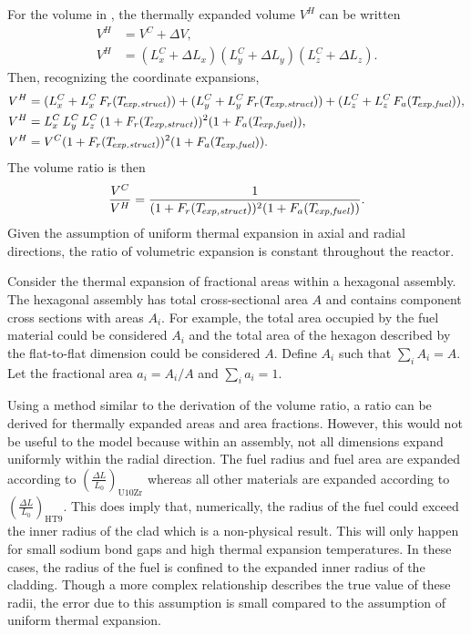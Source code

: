     For the volume in , the thermally expanded 
    volume $V^H$ can be written
    \begin{align}
      V^H &= V^C + \Delta V, \\
      V^H &= (L_x^C + \Delta L_x) (L_y^C + \Delta L_y) (L_z^C + \Delta L_z). 
    \end{align}
    Then, recognizing the coordinate expansions,
    \begin{align}
      V^H &= (L_x^C + L_x^C \, F_r(T_{\!\mbox{\scriptsize \em exp,struct}})) + 
        (L_y^C + L_y^C \, F_r(T_{\!\mbox{\scriptsize \em exp,struct}})) + 
        (L_z^C + L_z^C \, F_a({T_{\!\mbox{\scriptsize \em exp,fuel}}})), \\
      V^H &= L_x^C \, L_y^C \, L_z^C \, (1 + F_r(T_{\!\mbox{\scriptsize \em exp,struct}}))^2
        (1+F_a({T_{\!\mbox{\scriptsize \em exp,fuel}}})), \\
      V^H &= V^C (1 + F_r(T_{\!\mbox{\scriptsize \em exp,struct}}))^2 (1+F_a({T_{\!\mbox{\scriptsize \em exp,fuel}}})).
    \end{align}
    The volume ratio is then
    \begin{equation}
      \label{eq:volume_ratio}
      \frac{V^C}{V^H} = \frac{1}{(1+F_r(T_{\!\mbox{\scriptsize \em exp,struct}}))^2 (1+F_a({T_{\!\mbox{\scriptsize \em exp,fuel}}}))}.
    \end{equation}
    Given the assumption of uniform thermal expansion in axial and radial
    directions, the ratio of volumetric expansion is constant throughout the
    reactor.

    Consider the thermal expansion of fractional areas within a hexagonal
    assembly. The hexagonal assembly has total cross-sectional area $A$ and 
    contains component cross sections with areas $A_i$. For example, the total 
    area occupied by the fuel material could be considered $A_i$ and the total 
    area of the hexagon described by the flat-to-flat dimension could be 
    considered $A$. Define $A_i$ such that $\sum_{i} A_i = A$. Let the 
    fractional area $a_i = A_i/A$ and $\sum_{i} a_i = 1$.

    Using a method similar to the derivation of the volume ratio, a ratio can be
    derived for thermally expanded areas and area fractions. However, this would
    not be useful to the model because within an assembly, not all dimensions
    expand uniformly within the radial direction.
    The fuel radius and fuel area are expanded according to 
    $\left(\frac{\Delta L}{L_0}\right)_{\text{U10Zr}}$ whereas all other 
    materials are expanded according to 
    $\left(\frac{\Delta L}{L_0}\right)_{\text{HT9}}$. This does imply that,
    numerically, the radius of the fuel could exceed the inner radius of the 
    clad which is a non-physical result. This will only happen for small sodium 
    bond gaps and high thermal expansion temperatures. In these cases, the 
    radius of the fuel is confined to the expanded inner radius of the cladding.
    Though a more complex relationship describes the true value of these radii, 
    the error due to this assumption is small compared to the assumption of 
    uniform thermal expansion.
    
